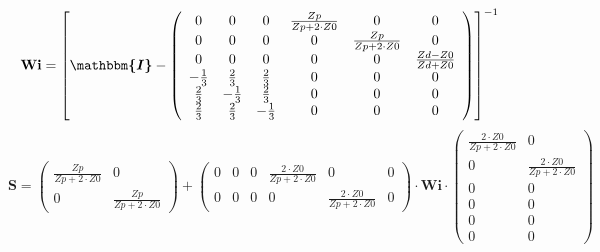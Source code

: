\[ \mathbf{Wi} =  \left[ \boldsymbol{\mathbbm{I}}  -
\left(\begin{array}{cccccc} 0 & 0 & 0 & \frac{Zp}{Zp+2\cdot Z0} & 0 &
0 \\ 0 & 0 & 0 & 0 & \frac{Zp}{Zp+2\cdot Z0} & 0 \\ 0 & 0 & 0 & 0 & 0
& \frac{ Zd -Z0}{ Zd +Z0} \\ -\frac{1}{3} & \frac{2}{3} & \frac{2}{3}
& 0 & 0 & 0 \\ \frac{2}{3} & -\frac{1}{3} & \frac{2}{3} & 0 & 0 & 0 \\
\frac{2}{3} & \frac{2}{3} & -\frac{1}{3} & 0 & 0 & 0
\end{array}\right) \right]^{-1}  \]
\[ \mathbf{S} = \left(\begin{array}{cc} \frac{Zp}{Zp+2\cdot Z0} & 0 \\
0 & \frac{Zp}{Zp+2\cdot Z0} \end{array}\right) +
\left(\begin{array}{cccccc} 0 & 0 & 0 & \frac{2\cdot Z0}{Zp+2\cdot Z0}
& 0 & 0 \\ 0 & 0 & 0 & 0 & \frac{2\cdot Z0}{Zp+2\cdot Z0} & 0
\end{array}\right) \cdot \mathbf{Wi} \cdot\left(\begin{array}{cc}
\frac{2\cdot Z0}{Zp+2\cdot Z0} & 0 \\ 0 & \frac{2\cdot Z0}{Zp+2\cdot
Z0} \\ 0 & 0 \\ 0 & 0 \\ 0 & 0 \\ 0 & 0 \end{array}\right) \]
